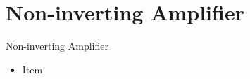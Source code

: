 \section{Non-inverting Amplifier}
\begin{frame}{Non-inverting Amplifier}
	\begin{itemize}
		\item Item
	\end{itemize}
\end{frame}